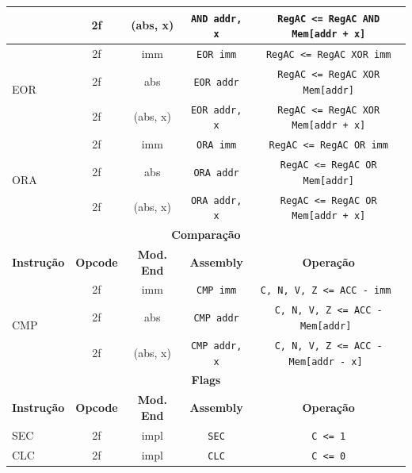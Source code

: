 \documentclass[
	12pt,				  %
	openright,		%
	a4paper,			%
	english,			%
	french,				%
	spanish,			%
	brazil,				%
]{abntex2}
\newcommand{\codenobg}[1]{\texttt{#1}}
\begin{document}
\begin{table}[htb]
\begin{tabular}{|l|c|c|c|c|}
		                     & 2f              & (abs, x)          & \codenobg{AND addr, x} & \codenobg{RegAC <= RegAC AND Mem[addr + x]}   \\ \hline
		\multirow{3}{*}{EOR} & 2f              & imm               & \codenobg{EOR imm}     & \codenobg{RegAC <= RegAC XOR imm}             \\ \cline{2-5}
		                     & 2f              & abs               & \codenobg{EOR addr}    & \codenobg{RegAC <= RegAC XOR Mem[addr]}       \\ \cline{2-5}
		                     & 2f              & (abs, x)          & \codenobg{EOR addr, x} & \codenobg{RegAC <= RegAC XOR Mem[addr + x]}   \\ \hline
		\multirow{3}{*}{ORA} & 2f              & imm               & \codenobg{ORA imm}     & \codenobg{RegAC <= RegAC OR imm}              \\ \cline{2-5}
		                     & 2f              & abs               & \codenobg{ORA addr}    & \codenobg{RegAC <= RegAC OR Mem[addr]}        \\ \cline{2-5}
		                     & 2f              & (abs, x)          & \codenobg{ORA addr, x} & \codenobg{RegAC <= RegAC OR Mem[addr + x]}    \\ \hline
		\multicolumn{5}{|c|}{\textbf{Comparação}}                                                                                           \\ \hline
		\textbf{Instrução}   & \textbf{Opcode} & \textbf{Mod. End} & \textbf{Assembly}      & \textbf{Operação}                             \\ \hline
		\multirow{3}{*}{CMP} & 2f              & imm               & \codenobg{CMP imm}     & \codenobg{C, N, V, Z <= ACC - imm }           \\ \cline{2-5}
		                     & 2f              & abs               & \codenobg{CMP addr}    & \codenobg{C, N, V, Z <= ACC - Mem[addr] }     \\ \cline{2-5}
		                     & 2f              & (abs, x)          & \codenobg{CMP addr, x} & \codenobg{C, N, V, Z <= ACC - Mem[addr - x] } \\ \hline
		\multicolumn{5}{|c|}{\textbf{Flags}}                                                                                                \\ \hline
		\textbf{Instrução}   & \textbf{Opcode} & \textbf{Mod. End} & \textbf{Assembly}      & \textbf{Operação}                             \\ \hline
		\multirow{1}{*}{SEC} & 2f              & impl              & \codenobg{SEC}         & \codenobg{C <= 1}                             \\ \hline
		\multirow{1}{*}{CLC} & 2f              & impl              & \codenobg{CLC}         & \codenobg{C <= 0}                             \\ \hline
	\end{tabular}
\end{table}
\end{document}
